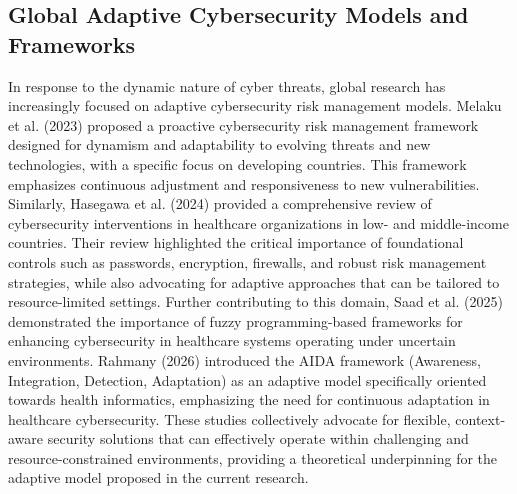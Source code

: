 \documentclass[12pt, a4paper, oneside]{report}
\begin{document}
	\subsection{Global Adaptive Cybersecurity Models and Frameworks}
	In response to the dynamic nature of cyber threats, global research has increasingly focused on adaptive cybersecurity risk management models. Melaku et al. (2023) \cite{melaku2023context} proposed a proactive cybersecurity risk management framework designed for dynamism and adaptability to evolving threats and new technologies, with a specific focus on developing countries. This framework emphasizes continuous adjustment and responsiveness to new vulnerabilities. Similarly, Hasegawa et al. (2024) \cite{nist2024sp80066r2} provided a comprehensive review of cybersecurity interventions in healthcare organizations in low- and middle-income countries. Their review highlighted the critical importance of foundational controls such as passwords, encryption, firewalls, and robust risk management strategies, while also advocating for adaptive approaches that can be tailored to resource-limited settings.
	Further contributing to this domain, Saad et al. (2025) \cite{hasegawa2024cybersecurity} demonstrated the importance of fuzzy programming-based frameworks for enhancing cybersecurity in healthcare systems operating under uncertain environments. Rahmany (2026) \cite{saad2025fuzzy} introduced the AIDA framework (Awareness, Integration, Detection, Adaptation) as an adaptive model specifically oriented towards health informatics, emphasizing the need for continuous adaptation in healthcare cybersecurity. These studies collectively advocate for flexible, context-aware security solutions that can effectively operate within challenging and resource-constrained environments, providing a theoretical underpinning for the adaptive model proposed in the current research.
	
\end{document}
